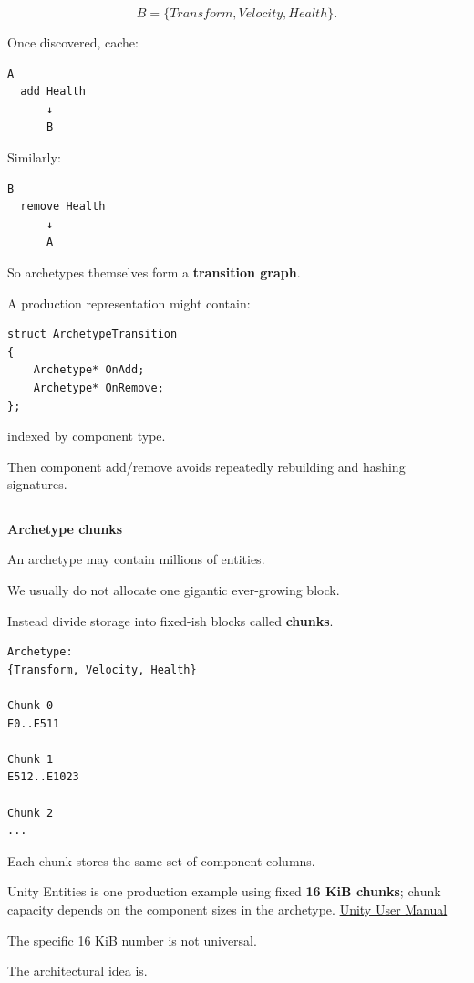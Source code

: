 \[
B=\{Transform,Velocity,Health\}.
\]

Once discovered, cache:

\begin{verbatim}
A
  add Health
      ↓
      B
\end{verbatim}

Similarly:

\begin{verbatim}
B
  remove Health
      ↓
      A
\end{verbatim}

So archetypes themselves form a \textbf{transition graph}.

A production representation might contain:

\begin{verbatim}
struct ArchetypeTransition
{
    Archetype* OnAdd;
    Archetype* OnRemove;
};
\end{verbatim}

indexed by component type.

Then component add/remove avoids repeatedly rebuilding and hashing signatures.

\begin{center}\rule{0.5\linewidth}{0.5pt}\end{center}

\textbf{Archetype chunks}

An archetype may contain millions of entities.

We usually do not allocate one gigantic ever-growing block.

Instead divide storage into fixed-ish blocks called \textbf{chunks}.

\begin{verbatim}
Archetype:
{Transform, Velocity, Health}

Chunk 0
E0..E511

Chunk 1
E512..E1023

Chunk 2
...
\end{verbatim}

Each chunk stores the same set of component columns.

Unity Entities is one production example using fixed \textbf{16 KiB chunks}; chunk capacity depends on the component sizes in the archetype. \href{https://docs.unity.cn/Packages/com.unity.entities\%401.0/manual/concepts-archetypes.html?utm_source=chatgpt.com}{Unity User Manual}

The specific 16 KiB number is not universal.

The architectural idea is.

